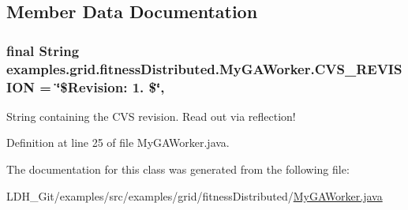 \subsection{Member Data Documentation}
\hypertarget{classexamples_1_1grid_1_1fitness_distributed_1_1_my_g_a_worker_ae88e640437019b5aa72c98e882348af4}{
\subsubsection[{C\-V\-S\-\_\-\-R\-E\-V\-I\-S\-I\-O\-N}]{\setlength{\rightskip}{0pt plus 5cm}final String examples.\-grid.\-fitness\-Distributed.\-My\-G\-A\-Worker.\-C\-V\-S\-\_\-\-R\-E\-V\-I\-S\-I\-O\-N = \char`\"{}\$Revision\-: 1. \$\char`\"{}\hspace{0.3cm}{\ttfamily [static]}, {\ttfamily [private]}}}\label{classexamples_1_1grid_1_1fitness_distributed_1_1_my_g_a_worker_ae88e640437019b5aa72c98e882348af4}
String containing the C\-V\-S revision. Read out via reflection! 

Definition at line 25 of file My\-G\-A\-Worker.\-java.



The documentation for this class was generated from the following file\-:\begin{DoxyCompactItemize}
\item 
L\-D\-H\-\_\-\-Git/examples/src/examples/grid/fitness\-Distributed/\hyperlink{fitness_distributed_2_my_g_a_worker_8java}{My\-G\-A\-Worker.\-java}\end{DoxyCompactItemize}
